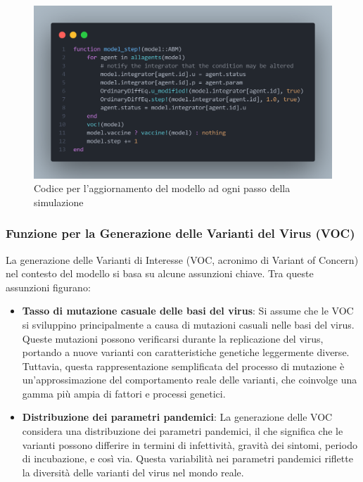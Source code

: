 \begin{figure}[H]
    \begin{center}
		\includegraphics[scale=0.29]{img/model_step_code.png}
		\caption{Codice per l'aggiornamento del modello ad ogni passo della simulazione}
		\label{fig:model_step_code}
	\end{center}
\end{figure}

\subsubsection{Funzione per la Generazione delle Varianti del Virus (VOC)}

La generazione delle Varianti di Interesse 
(VOC, acronimo di Variant of Concern) nel contesto del modello si 
basa su alcune assunzioni chiave. Tra queste assunzioni figurano:

\begin{itemize}
	\item \textbf{Tasso di mutazione casuale delle basi del virus}: 
	Si assume che le VOC si sviluppino principalmente a causa di 
	mutazioni casuali nelle basi del virus. Queste mutazioni possono 
	verificarsi durante la replicazione del virus, portando a nuove 
	varianti con caratteristiche genetiche leggermente diverse. 
	Tuttavia, questa rappresentazione semplificata del processo di 
	mutazione è un'approssimazione del comportamento reale delle 
	varianti, che coinvolge una gamma più ampia di fattori e processi 
	genetici.
	\item \textbf{Distribuzione dei parametri pandemici}: La generazione 
	delle VOC considera una distribuzione dei parametri pandemici, 
	il che significa che le varianti possono differire in termini di 
	infettività, gravità dei sintomi, periodo di incubazione, e così via. 
	Questa variabilità nei parametri pandemici riflette la diversità 
	delle varianti del virus nel mondo reale.
\end{itemize}

